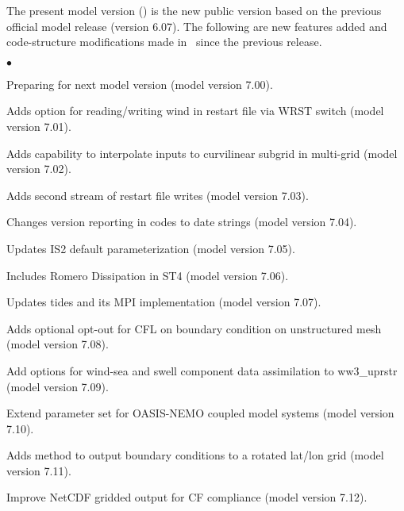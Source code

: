 \vspace{\baselineskip} 
\noindent 
The present model version (\WWver) is the new public version based on the
previous official model release (version 6.07). The following are new features added 
and code-structure modifications made in \ws\ \WWver since the previous release.

\begin{list}{$\bullet$}{\rightmargin 5mm \parsep 0mm \itemsep 0mm}

\item Preparing for next model version (model version 7.00).

\item Adds option for reading/writing wind in restart file via WRST switch (model version 7.01).

\item Adds capability to interpolate inputs to curvilinear subgrid in multi-grid  (model version 7.02).

\item Adds second stream of restart file writes (model version 7.03).

\item Changes version reporting in codes to date strings (model version 7.04).

\item Updates IS2 default parameterization (model version 7.05).

\item Includes Romero Dissipation in ST4 (model version 7.06).

\item Updates tides and its MPI implementation (model version 7.07).

\item Adds optional opt-out for CFL on boundary condition on unstructured mesh (model version 7.08).

\item Add options for wind-sea and swell component data assimilation to ww3\_uprstr (model version 7.09).

\item Extend parameter set for OASIS-NEMO coupled model systems (model version 7.10).

\item Adds method to output boundary conditions to a rotated lat/lon grid (model version 7.11).

\item Improve NetCDF gridded output for CF compliance (model version 7.12).


\end{list}
